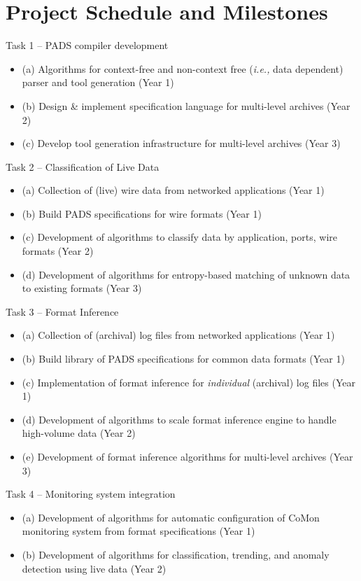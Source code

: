 \documentclass[12pt]{article}
\begin{document}


\section{Project Schedule and Milestones}

Task 1 -- PADS compiler development
\begin{itemize}
\item (a) Algorithms for context-free and non-context free ({\em i.e.,} data dependent) parser and tool generation (Year 1)
\item (b) Design \& implement specification language for multi-level archives (Year 2)
\item (c) Develop tool generation infrastructure for multi-level archives (Year 3)
\end{itemize}

\noindent
Task 2 -- Classification of Live Data
\begin{itemize}
\item (a) Collection of (live) wire data from networked applications (Year 1)
\item (b) Build PADS specifications for wire formats (Year 1)
\item (c) Development of algorithms to classify data by application, ports, wire formats (Year 2)
\item (d) Development of algorithms for entropy-based matching of unknown data to existing formats (Year 3)
\end{itemize}

\noindent
Task 3 -- Format Inference
\begin{itemize}
\item (a) Collection of (archival) log files from networked applications (Year 1)
\item (b) Build library of PADS specifications for common data formats (Year 1)
\item (c) Implementation of format inference for {\em individual} (archival) log files (Year 1)
\item (d) Development of algorithms to scale format inference engine to handle high-volume data (Year 2)
\item (e) Development of format inference algorithms for multi-level archives (Year 3)
\end{itemize}

\noindent
Task 4 -- Monitoring system integration
\begin{itemize}
\item (a) Development of algorithms for automatic configuration of CoMon monitoring system from format specifications (Year 1)
\item (b) Development of algorithms for classification, trending, and 
anomaly detection using live data (Year 2)
\end{itemize}
\end{document}
